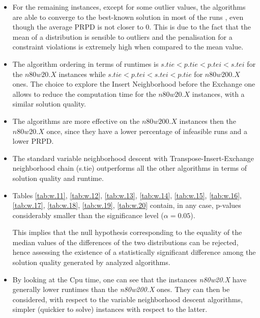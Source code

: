 \begin{homeworkProblem}
\begin{itemize}
\item For the remaining instances, except for some outlier values, the algorithms are able to converge to the best-known solution in most of the runs , even though the average PRPD is not closer to 0. This is due to the fact that the mean of a distribution is sensible to outliers and the penalisation for a constraint violations is extremely high when compared to the mean value.
      
\item The algorithm ordering in terms of runtimes is $s.tie < p.tie < p.tei < s.tei$ for the  $n80w20.X$ instances while $s.tie < p.tei < s.tei < p.tie$ for $n80w200.X$ ones. The choice to explore the Insert Neighborhood before the Exchange one allows to reduce the computation time for the $n80w20.X$ instances, with a similar solution quality.

\item The algorithms are more effective on the $n80w200.X$ instances then the $n80w20.X$ once, since they have a lower percentage of infeasible runs and a lower PRPD.

\item The standard variable neighborhood descent with Transpose-Insert-Exchange neighborhood chain (s.tie) outperforms all the other algorithms in terms of solution quality and runtime.

\item Tables \ref{tab:w.11}, \ref{tab:w.12}, \ref{tab:w.13}, \ref{tab:w.14}, \ref{tab:w.15}, \ref{tab:w.16}, \ref{tab:w.17}, \ref{tab:w.18}, \ref{tab:w.19}, \ref{tab:w.20} contain, in any case, p-values considerably smaller than the significance level ($\alpha=0.05$). 

This implies that the null hypothesis corresponding to the equality of the median values of the differences of the two distributions can be rejected, hence assessing the existence of a statistically significant difference among the solution quality generated by analyzed algorithms.

\item By looking at the Cpu time, one can see that the instances \emph{n80w20.X} have generally lower runtimes than the \emph{n80w200.X} ones. They can then be considered, with respect to the variable neighborhood descent algorithms, simpler (quickier to solve) instances with respect to the latter.

\end{itemize}

\end{homeworkProblem}

